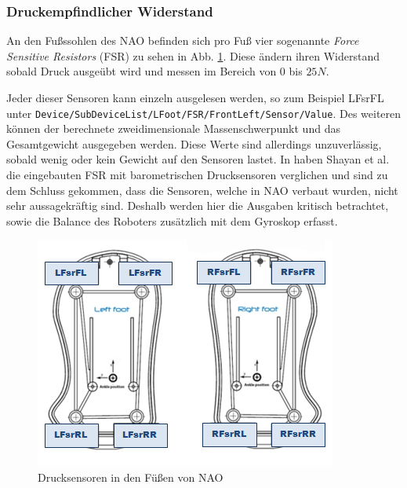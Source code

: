 \subsubsection*{Druckempfindlicher Widerstand}

An den Fußssohlen des NAO befinden sich pro Fuß vier sogenannte \textit{Force Sensitive Resistors} (FSR) zu sehen in Abb. \ref{hardware_semelles}. Diese ändern ihren Widerstand sobald Druck ausgeübt wird und messen im Bereich von 0 bis $25 \unit{N}$.

Jeder dieser Sensoren kann einzeln ausgelesen werden, so zum Beispiel LFsrFL unter \texttt{Device/SubDeviceList/LFoot/FSR/FrontLeft/Sensor/Value}. Des weiteren können der berechnete zweidimensionale Massenschwerpunkt und das Gesamtgewicht ausgegeben werden. Diese Werte sind allerdings unzuverlässig, sobald wenig oder kein Gewicht auf den Sensoren lastet. In \cite{pressure_shoe} haben Shayan et al. die eingebauten FSR mit barometrischen Drucksensoren verglichen und sind zu dem Schluss gekommen, dass die Sensoren, welche in NAO verbaut wurden, nicht sehr aussagekräftig sind. Deshalb werden hier die Ausgaben kritisch betrachtet, sowie die Balance des Roboters zusätzlich mit dem Gyroskop erfasst.
\begin{figure}[tb]
	\centering
	\includegraphics[width=0.6\linewidth]{Bilder/hardware_semelles.png}
	\caption{Drucksensoren in den Füßen von NAO \cite[ in /Technical overview/FSRs]{nao_docu_dev_guide}
	}
	\label{hardware_semelles}
\end{figure}

